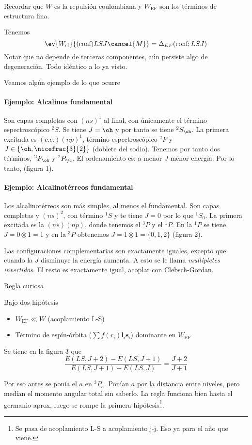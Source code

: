 Recordar que $W$ es la repulsión coulombiana y $W_\text{EF}$ son los
términos de estructura fina. 

Tenemos
\begin{equation}
  \ev{W_\text{ef}}{(\text{conf})LSJ\cancel{M}} = \Delta_{EF}(\text{conf};LSJ)
\end{equation}
Notar que no depende de terceras componentes, aún persiste algo de
degeneración. Todo idéntico a lo ya visto.

Veamos algún ejemplo de lo que ocurre

\paragraph{Ejemplo: Alcalinos fundamental}
Son capas completas con $(ns)^1$ al final, con únicamente el término
espectroscópico ${}^2S$. Se tiene $J=\oh$ y por tanto se tiene
${}^2S_\oh$. La primera excitada es $(c.c.)(np)^1$, término
espectroscópico ${}^2P$ y $J\in\{\oh,\nicefrac{3}{2}\}$ (doblete del
sodio). Tenemos por tanto dos términos, ${}^2P_\oh$ y
${}^2P_{\nicefrac{3}{2}}$. El ordenamiento es: a menor $J$ menor
energía. Por lo tanto, (figura 1).


\paragraph{Ejemplo: Alcalinotérreos fundamental}
Los alcalinotérreos son más simples, al menos el fundamental. Son
capas completas y $(ns)^2$, con término ${}^1S$ y te tiene $J=0$ por
lo que ${}^1S_0$. La primera excitada es la $(ns)(np)$, donde tenemos
el ${}^3P$ y el ${}^1P$. En la ${}^1P$ se tiene $J=0\otimes1=1$ y en
la ${}^3P$ obtenemos $J=1\otimes1=\{0,1,2\}$ (figura 2).

Las configuraciones complementarias son exactamente iguales, excepto
que cuando la $J$ disminuye la energía aumenta. A esto se le llama
\emph{multipletes invertidos}. El resto es exactamente igual, acoplar
con Clebsch-Gordan.

Regla curiosa

\begin{thm}
Bajo dos hipótesis
\begin{itemize}
\item $W_\text{EF}\ll W$ (acoplamiento L-S)
\item Término de espín-órbita ($\sum f(r_i)\mathbf{l}_i \mathbf{s}_i$)
  dominante en $W_\text{EF}$
\end{itemize}
Se tiene en la figura 3 que
\begin{equation}
  \frac{E(LS,J+2)-E(LS,J+1)}{E(LS,J+1)-E(LS,J)} = \frac{J+2}{J+1}
\end{equation}
\end{thm}
Por eso antes se ponía el $a$ en ${}^3 P_a$. Ponían $a$ por la distancia
entre niveles, pero medían el momento angular total sin saberlo.
La regla funciona bien hasta el germanio aprox, luego se rompe la
primera hipótesis\footnote{Se pasa de acoplamiento L-S a acoplamiento
j-j. Eso ya para el año que viene.}.

